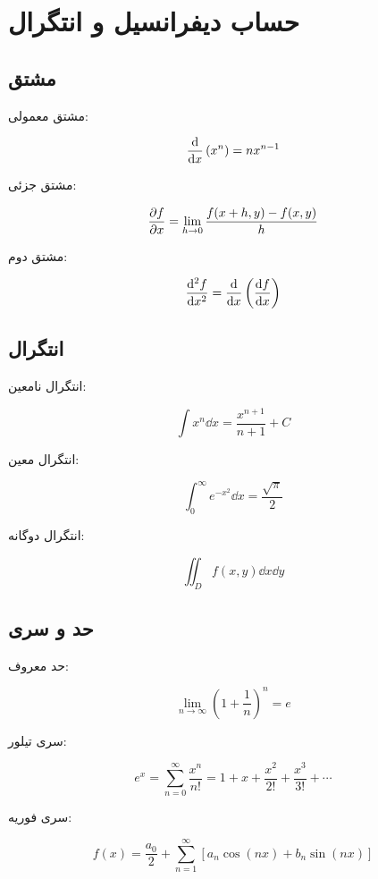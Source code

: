 \documentclass{matinbook}
\begin{document}
\chapter{حساب دیفرانسیل و انتگرال}
\label{chap:calculus}

\section{مشتق}
\label{sec:calculus-derivatives}

مشتق معمولی:

\[
\frac{\mathrm{d}}{\mathrm{d}x}\left( x^{n} \right) = n x^{n-1}
\]

مشتق جزئی:

\[
\frac{\partial f}{\partial x} = \lim_{h \to 0} \frac{f(x+h, y) - f(x, y)}{h}
\]

مشتق دوم:

\[
\frac{\mathrm{d}^{2}f}{\mathrm{d}x^{2}} = \frac{\mathrm{d}}{\mathrm{d}x}\left( \frac{\mathrm{d}f}{\mathrm{d}x} \right)
\]

\section{انتگرال}
\label{sec:calculus-integrals}

انتگرال نامعین:

\[
\int x^{n} \dd{x} = \frac{x^{n+1}}{n+1} + C
\]

انتگرال معین:

\[
\int_{0}^{\infty} e^{-x^{2}} \dd{x} = \frac{\sqrt{\pi}}{2}
\]

انتگرال دوگانه:

\[
\iint_{D} f(x, y) \dd{x}\dd{y}
\]

\section{حد و سری}
\label{sec:calculus-limits}

حد معروف:

\[
\lim_{n \to \infty} \left(1 + \frac{1}{n}\right)^{n} = e
\]

سری تیلور:

\[
e^{x} = \sum_{n=0}^{\infty} \frac{x^{n}}{n!}
= 1 + x + \frac{x^{2}}{2!} + \frac{x^{3}}{3!} + \cdots
\]

سری فوریه:

\[
f(x) = \frac{a_{0}}{2} + \sum_{n=1}^{\infty}
\left[ a_{n} \cos(nx) + b_{n} \sin(nx) \right]
\]
\end{document}
